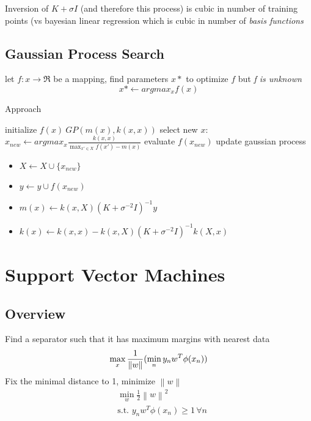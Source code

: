 \documentclass[]{article}
\theoremstyle{definition}
\newcommand\norm[1]{\left\lVert#1\right\rVert}
\begin{document}
Inversion of $K + \sigma I$ (and therefore this process) is cubic in number of training points
(vs bayesian linear regression which is cubic in number of \textit{basis functions}

\subsection{Gaussian Process Search}
\label{sub:gaussian_process_search}

let $f: x \to \Re$ be a mapping, find parameters $x*$ to optimize $f$ but \textit{f is unknown}
\begin{equation*}
    x* \gets argmax_x f(x)
\end{equation*}

\medskip

Approach
\begin{algorithmic}
    \State initialize $f(x) ~ GP(m(x), k(x,x))$
    \Repeat
    \State select new $x$: $x_{new} \gets argmax_x \frac{k(x,x)}{\max_{x' \in X} f(x') - m(x)}$
    \State evaluate $f(x_{new})$
    \State update gaussian process
    \begin{itemize}
        \item $X \gets X \cup \{x_{new}\}$
        \item $y \gets y \cup f(x_{new})$
        \item $m(x) \gets k(x, X)(K + \sigma^{-2} I)^{-1} y$
        \item $k(x) \gets k(x,x) - k(x, X)(K + \sigma^{-2} I)^{-1} k(X, x)$
    \end{itemize}
\end{algorithmic}

\section{Support Vector Machines}
\label{sec:support_vector_machines}

\subsection{Overview}

Find a separator such that it has maximum margins with nearest data
\begin{equation*}
    \max_x \frac{1}{\norm{w}} (\min_n y_n w^T \phi(x_n)) \\
\end{equation*}
Fix the minimal distance to 1, minimize $\norm{w}$
\begin{equation*}
    \begin{split}
        & \min_w \frac{1}{2} \norm{w}^2 \\
        & \text{s.t. } y_n w^T \phi(x_n) \geq 1 \, \forall n
    \end{split}
\end{equation*}
\end{document}
